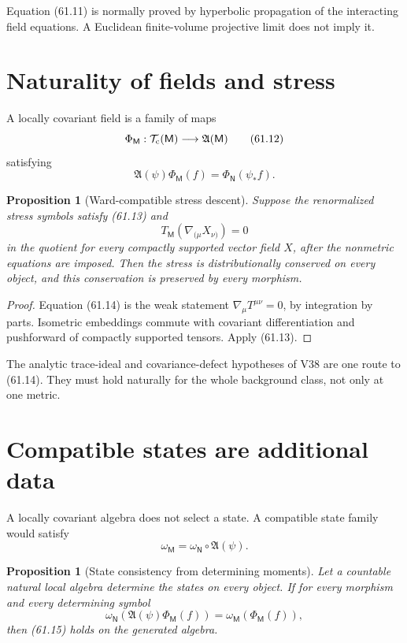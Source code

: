 \documentclass[11pt]{article}
\newtheorem{proposition}[theorem]{Proposition}
\theoremstyle{remark}
\begin{document}
Equation (61.11) is normally proved by hyperbolic propagation of
the interacting field equations.  A Euclidean finite-volume
projective limit does not imply it.

\section{Naturality of fields and stress}

A locally covariant field is a family of maps
\[
 \Phi_{\mathsf M}:{\cal T}_{\rm c}({\mathsf M})
 \longrightarrow{\mathfrak A}({\mathsf M})              \tag{61.12}
\]
satisfying
\[
 {\mathfrak A}(\psi)\Phi_{\mathsf M}(f)
 =\Phi_{\mathsf N}(\psi_*f).                            \tag{61.13}
\]

\begin{proposition}[Ward-compatible stress descent]
\label{prop:v15v61-stress}
Suppose the renormalized stress symbols satisfy (61.13) and
\[
 T_{\mathsf M}(\nabla_{(\mu}X_{\nu)})=0                 \tag{61.14}
\]
in the quotient for every compactly supported vector field \(X\),
after the nonmetric equations are imposed.  Then the stress is
distributionally conserved on every object, and this conservation
is preserved by every morphism.
\end{proposition}

\begin{proof}
Equation (61.14) is the weak statement
\(\nabla_\mu T^{\mu\nu}=0\), by integration by parts.  Isometric
embeddings commute with covariant differentiation and pushforward
of compactly supported tensors.  Apply (61.13).
\end{proof}

The analytic trace-ideal and covariance-defect hypotheses of V38
are one route to (61.14).  They must hold naturally for the whole
background class, not only at one metric.

\section{Compatible states are additional data}

A locally covariant algebra does not select a state.  A compatible
state family would satisfy
\[
 \omega_{\mathsf M}
 =\omega_{\mathsf N}\circ{\mathfrak A}(\psi).            \tag{61.15}
\]

\begin{proposition}[State consistency from determining moments]
\label{prop:v15v61-state}
Let a countable natural local algebra determine the states on every
object.  If for every morphism and every determining symbol
\[
 \omega_{\mathsf N}
 ({\mathfrak A}(\psi)\Phi_{\mathsf M}(f))
 =\omega_{\mathsf M}(\Phi_{\mathsf M}(f)),              \tag{61.16}
\]
then (61.15) holds on the generated algebra.
\end{proposition}
\end{document}
